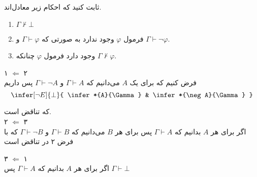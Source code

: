 
		ثابت کنید که احکام زیر معادل‌اند.
		 \begin{enumerate}
		 	\item $\Gamma\nvdash \bot$	
		 	\item فرمول
		 	$\varphi$
		 	وجود ندارد به صورتی که 
		 	$\Gamma \vdash \varphi$ 
		 	و
		 	$\Gamma \vdash \neg \varphi$.
		 	
		 	\item وجود دارد فرمول
			$\varphi$
			چنانکه $\Gamma \nvdash \varphi$.
		 	
		 \end{enumerate}
		 
	\quad\vspace {-0.5 cm}
	\begin{ans}
		۱ $\Leftarrow$ ۲ \\
		 فرض کنیم که برای یک $A$ می‌دانیم که
		 $\Gamma \vdash A$
		 و 
		 $\Gamma \vdash \neg A$
		 پس داریم
		 $$
		 	\infer[\neg E]{\bot}{
		 		\infer*{A}{\Gamma}
		 		&
		 		\infer*{\neg A}{\Gamma}
		 	}	
		 $$ 

که تناقض است.\\
		۲ $\Leftarrow$ ۳ \\
		اگر برای هر 
		$A$
		بدانیم که
		$\Gamma \vdash A$
		پس برای هر 
		$B$
		می‌دانیم که 
		$\Gamma \vdash B$ و
		$\Gamma \vdash \neg B$
		که با فرض ۲ در تناقض است
		
		۳ $\Leftarrow$ ۱ \\
		اگر برای هر 
		$A$
		بدانیم که
		$\Gamma \vdash A$
		پس 
		$\Gamma \vdash \bot$
		 
	\end{ans}
